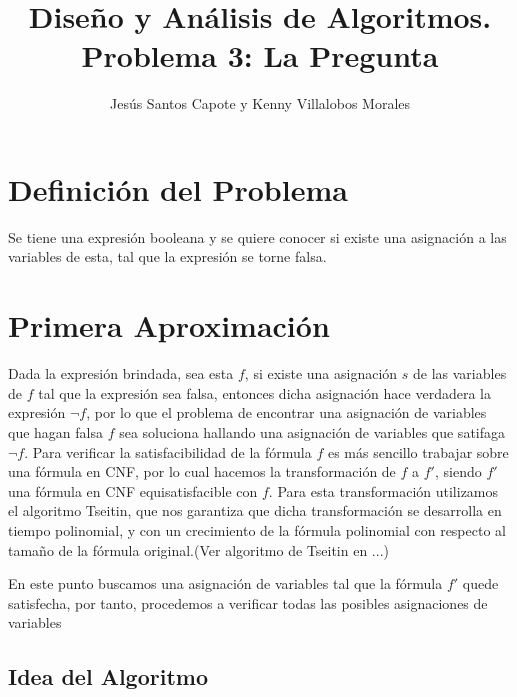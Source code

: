 \documentclass[article]{llncs}
\begin{document}
%
\title{Dise\~{n}o y An\'alisis de Algoritmos. Problema 3: La Pregunta}
%
%
\author{Jes\'us Santos Capote y Kenny Villalobos Morales}
%
%
\maketitle              %
%
\section{Definici\'on del Problema}

Se tiene una expresión booleana y se quiere conocer si existe una asignación a las variables de esta, tal que la expresión se
torne falsa.

\section{Primera Aproximaci\'on}

Dada la expresión brindada, sea esta $f$, si existe una asignación $s$ de las variables de $f$ tal que la expresión sea falsa,
entonces dicha asignación hace verdadera la expresión $\lnot f$, por lo que el problema de encontrar una asignación de variables que
hagan falsa $f$ sea soluciona hallando una asignación de variables que satifaga $\lnot f$. Para verificar la satisfacibilidad de
la fórmula $f$ es más sencillo trabajar sobre una fórmula en CNF, por lo cual hacemos la transformación de $f$ a $f'$, siendo $f'$
una fórmula en CNF equisatisfacible con $f$. Para esta transformación utilizamos el algoritmo Tseitin, que nos garantiza que dicha
transformación se desarrolla en tiempo polinomial, y con un crecimiento de la fórmula polinomial con respecto al tamaño de la
fórmula original.(Ver algoritmo de Tseitin en ...)

En este punto buscamos una asignación de variables tal que la fórmula $f'$ quede satisfecha, por tanto, procedemos a verificar todas
las posibles asignaciones de variables



\subsection{Idea del Algoritmo}
\end{document}
